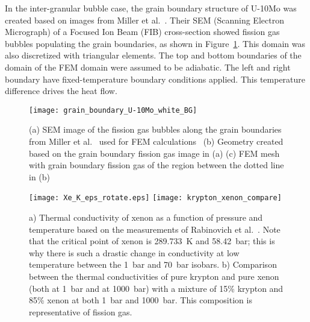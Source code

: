 In the inter-granular bubble case, the grain boundary structure of U-10Mo was created based on images from Miller et al.~\cite{miller2012advantages}. Their SEM (Scanning Electron Micrograph) of a Focused Ion Beam (FIB) cross-section showed fission gas bubbles populating the grain boundaries, as shown in Figure~\ref{fig_Xe_SEM}. This domain was also discretized with triangular elements. The top and bottom boundaries of the domain of the FEM domain were assumed to be adiabatic. The left and right boundary have fixed-temperature boundary conditions applied. This temperature difference drives the heat flow. 


\begin{figure}%
\centering
\texttt{[image: grain\_boundary\_U-10Mo\_white\_BG]}
\caption[(a) SEM image of the fission gas bubbles along the grain boundaries from Miller et al.~\cite{miller2012advantages} used for FEM calculations~\cite{miller2012advantages} (b) Geometry created based on the grain boundary fission gas image in (a)]{(a) SEM image of the fission gas bubbles along the grain boundaries from Miller et al.~\cite{miller2012advantages} used for FEM calculations~\cite{miller2012advantages} (b) Geometry created based on the grain boundary fission gas image in (a) (c) FEM mesh with grain boundary fission gas of the region between the dotted line in  (b) }
\label{fig_Xe_SEM}
\end{figure}
\begin{figure}
\centering
\texttt{[image: Xe\_K\_eps\_rotate.eps]}
\texttt{[image: krypton\_xenon\_compare]}
\caption{a) Thermal conductivity of xenon as a function of pressure and
temperature based on the measurements of Rabinovich et
al.~\cite{rabinovich1987thermophysical}.  Note that the critical point of xenon
is 289.733~K and 58.42~bar; this is why there is such a drastic change in
conductivity at low temperature between the 1~bar and 70~bar isobars.
{b) Comparison between the thermal conductivities of pure
krypton and pure xenon (both at 1~bar and at 1000~bar) with a mixture of
15\% krypton and 85\% xenon at both 1~bar and 1000~bar. This composition is
representative of fission gas.}}
\label{fig_Xe_pressure}

\end{figure}

